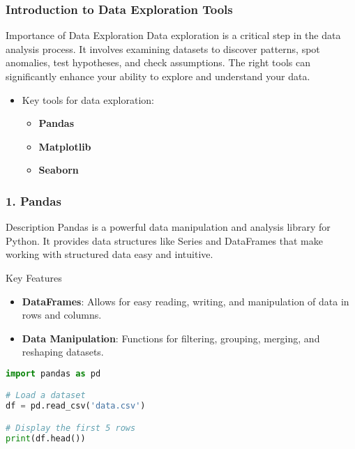 \documentclass[aspectratio=169]{beamer}
\begin{document}
\begin{frame}
    \frametitle{Introduction to Data Exploration Tools}
    \begin{block}{Importance of Data Exploration}
        Data exploration is a critical step in the data analysis process. It involves examining datasets to discover patterns, spot anomalies, test hypotheses, and check assumptions. The right tools can significantly enhance your ability to explore and understand your data.
    \end{block}
    \begin{itemize}
        \item Key tools for data exploration:
        \begin{itemize}
            \item \textbf{Pandas}
            \item \textbf{Matplotlib}
            \item \textbf{Seaborn}
        \end{itemize}
    \end{itemize}
\end{frame}

\begin{frame}[fragile]
    \frametitle{1. Pandas}
    \begin{block}{Description}
        Pandas is a powerful data manipulation and analysis library for Python. It provides data structures like Series and DataFrames that make working with structured data easy and intuitive.
    \end{block}
    \begin{block}{Key Features}
        \begin{itemize}
            \item \textbf{DataFrames}: Allows for easy reading, writing, and manipulation of data in rows and columns.
            \item \textbf{Data Manipulation}: Functions for filtering, grouping, merging, and reshaping datasets.
        \end{itemize}
    \end{block}
    \begin{lstlisting}[language=Python]
import pandas as pd

# Load a dataset
df = pd.read_csv('data.csv')

# Display the first 5 rows
print(df.head())
    \end{lstlisting}
\end{frame}
\end{document}

